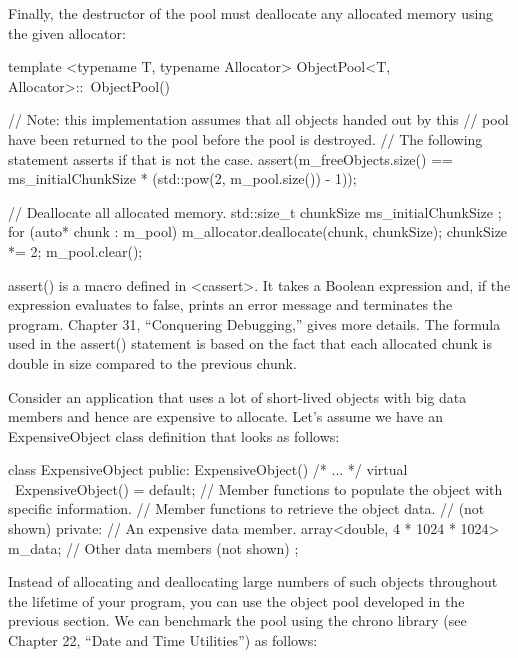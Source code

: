 Finally, the destructor of the pool must deallocate any allocated memory using the given allocator:

\begin{cpp}
template <typename T, typename Allocator>
ObjectPool<T, Allocator>::~ObjectPool()
{
    // Note: this implementation assumes that all objects handed out by this
    //       pool have been returned to the pool before the pool is destroyed.
    //       The following statement asserts if that is not the case.
    assert(m_freeObjects.size() ==
        ms_initialChunkSize * (std::pow(2, m_pool.size()) - 1));

    // Deallocate all allocated memory.
    std::size_t chunkSize { ms_initialChunkSize };
    for (auto* chunk : m_pool) {
        m_allocator.deallocate(chunk, chunkSize);
        chunkSize *= 2;
    }
    m_pool.clear();
}
\end{cpp}

assert() is a macro defined in <cassert>. It takes a Boolean expression and, if the expression evaluates to false, prints an error message and terminates the program. Chapter 31, “Conquering Debugging,” gives more details. The formula used in the assert() statement is based on the fact that each allocated chunk is double in size compared to the previous chunk.


Consider an application that uses a lot of short-lived objects with big data members and hence are expensive to allocate. Let’s assume we have an ExpensiveObject class definition that looks as follows:

\begin{cpp}
class ExpensiveObject
{
    public:
        ExpensiveObject() { /* ... */ }
        virtual ~ExpensiveObject() = default;
        // Member functions to populate the object with specific information.
        // Member functions to retrieve the object data.
        // (not shown)
    private:
        // An expensive data member.
        array<double, 4 * 1024 * 1024> m_data;
        // Other data members (not shown)
};
\end{cpp}

Instead of allocating and deallocating large numbers of such objects throughout the lifetime of your program, you can use the object pool developed in the previous section. We can benchmark the pool using the chrono library (see Chapter 22, “Date and Time Utilities”) as follows:

